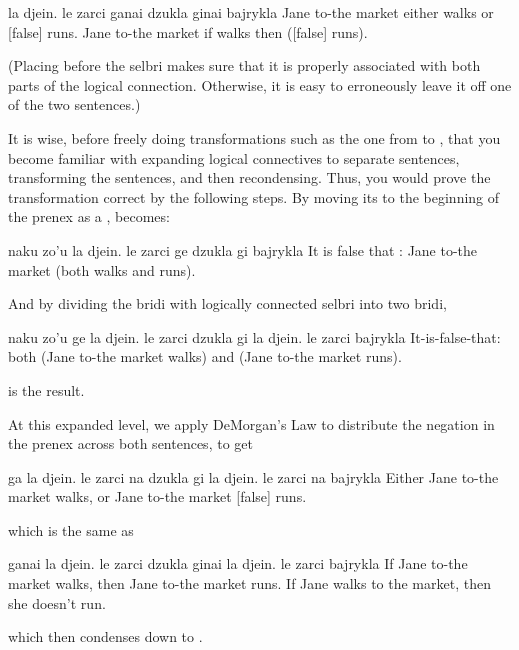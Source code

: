 \begin{example}
la djein. le zarci ganai dzukla ginai bajrykla\n
Jane to-the market either  walks or [false] runs.\n
Jane to-the market if walks then ([false] runs).
\end{example}

(Placing  before the selbri makes sure that it is
    properly associated with both parts of the logical connection.
    Otherwise, it is easy to erroneously leave it off one of the
    two sentences.) 

It is wise, before freely doing transformations such as the
    one from  to , that you become familiar with
    expanding logical connectives to separate sentences,
    transforming the sentences, and then recondensing. Thus, you
    would prove the transformation correct by the following steps.
    By moving its  to the beginning of the prenex as a
    ,  becomes:
\begin{example}
naku zo'u la djein. le zarci\n
\T	ge dzukla gi bajrykla\n
It is false that : Jane to-the market\n
\T	(both walks and runs).
\end{example}

And by dividing the bridi with logically connected selbri
    into two bridi,
\begin{example}
naku zo'u ge la djein. le zarci dzukla\n
\T	gi la djein. le zarci bajrykla\n
It-is-false-that: both (Jane to-the market walks)\n
\T	and (Jane to-the market runs).
\end{example}

{\noindent}is the result. 

At this expanded level, we apply DeMorgan's Law to
    distribute the negation in the prenex across both sentences, to
    get
\begin{example}
ga la djein. le zarci na dzukla\n
\T	gi la djein. le zarci na bajrykla\n
Either Jane to-the market  walks,\n
\T	or Jane to-the market [false] runs.
\end{example}

{\noindent}which is the same as
\begin{example}
ganai la djein. le zarci dzukla\n
\T	ginai la djein. le zarci bajrykla\n
If Jane to-the market walks,\n
\T	then Jane to-the market  runs.\n
If Jane walks to the market, then she doesn't run.
\end{example}

{\noindent}which then condenses down to .

